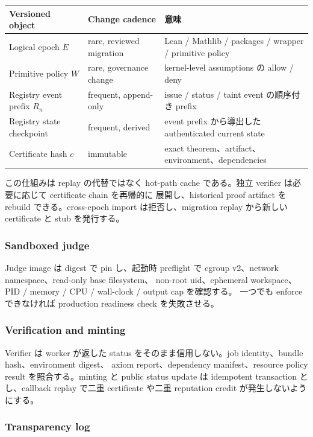 \documentclass[a4paper,11pt]{ltjsarticle}
\begin{document}
\begin{tabularx}{0.96\linewidth}{L{43mm}YY}
\toprule
\textbf{Versioned object} & \textbf{Change cadence} & \textbf{意味} \\
\midrule
Logical epoch $E$ & rare, reviewed migration & Lean / Mathlib / packages / wrapper / primitive policy \\
Primitive policy $W$ & rare, governance change & kernel-level assumptions の allow / deny \\
Registry event prefix $R_n$ & frequent, append-only & issue / status / taint event の順序付き prefix \\
Registry state checkpoint & frequent, derived & event prefix から導出した authenticated current state \\
Certificate hash $c$ & immutable & exact theorem、artifact、environment、dependencies \\
\bottomrule
\end{tabularx}

この仕組みは replay の代替ではなく hot-path cache である。独立 verifier は必要に応じて certificate chain を再帰的に
展開し、historical proof artifact を rebuild できる。cross-epoch import は拒否し、migration replay から新しい
certificate と stub を発行する。

\subsubsection{Sandboxed judge}

Judge image は digest で pin し、起動時 preflight で cgroup v2、network namespace、read-only base filesystem、
non-root uid、ephemeral workspace、PID / memory / CPU / wall-clock / output cap を確認する。
一つでも enforce できなければ production readiness check を失敗させる。

\subsubsection{Verification and minting}

Verifier は worker が返した status をそのまま信用しない。job identity、bundle hash、environment digest、
axiom report、dependency manifest、resource policy result を照合する。minting と public status update は
idempotent transaction とし、callback replay で二重 certificate や二重 reputation credit が発生しないようにする。

\subsubsection{Transparency log}
\end{document}
